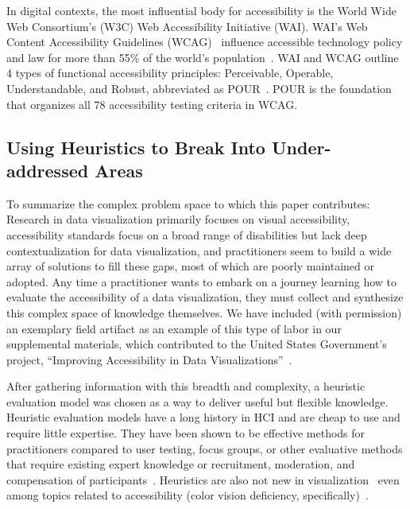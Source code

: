 \documentclass{egpubl}
\begin{document}
In digital contexts, the most influential body for accessibility is the World Wide Web Consortium’s (W3C) Web Accessibility Initiative (WAI). WAI’s Web Content Accessibility Guidelines (WCAG)~\cite{noauthor_web_nodate} influence accessible technology policy and law for more than 55\% of the world’s population~\cite{initiative_wai_web_2021}. WAI and WCAG outline 4 types of functional accessibility principles: Perceivable, Operable, Understandable, and Robust, abbreviated as POUR~\cite{initiative_wai_accessibility_nodate}. POUR is the foundation that organizes all 78 accessibility testing criteria in WCAG.

\subsection{Using Heuristics to Break Into Under-addressed Areas}
To summarize the complex problem space to which this paper contributes: Research in data visualization primarily focuses on visual accessibility, accessibility standards focus on a broad range of disabilities but lack deep contextualization for data visualization, and practitioners seem to build a wide array of solutions to fill these gaps, most of which are poorly maintained or adopted. Any time a practitioner wants to embark on a journey learning how to evaluate the accessibility of a data visualization, they must collect and synthesize this complex space of knowledge themselves. We have included (with permission) an exemplary field artifact as an example of this type of labor in our supplemental materials, which contributed to the United States Government's project, ``Improving Accessibility in Data Visualizations''~\cite{noauthor_improving_nodate,noauthor_data_nodate}.

After gathering information with this breadth and complexity, a heuristic evaluation model was chosen as a way to deliver useful but flexible knowledge. Heuristic evaluation models have a long history in HCI and are cheap to use and require little expertise. They have been shown to be effective methods for practitioners compared to user testing, focus groups, or other evaluative methods that require existing expert knowledge or recruitment, moderation, and compensation of participants~\cite{martinez_methodology_2021,chuan_usability_2015,brangier_beyond_2018,experience_10_nodate,joyce_mobile_2016,nielsen_heuristic_1994,otey_methodology_2017,santos_heuristic_2018,slavkovic_novice_1999,noauthor_unlocking_2018}. Heuristics are also not new in visualization~\cite{forsell_heuristic_2010,craft_beyond_2005,oliveira_adapting_2022, scholtz_developing_2011} even among topics related to accessibility (color vision deficiency, specifically)~\cite{santos_heuristic_2018, oliveira_towards_2013}.
\end{document}
